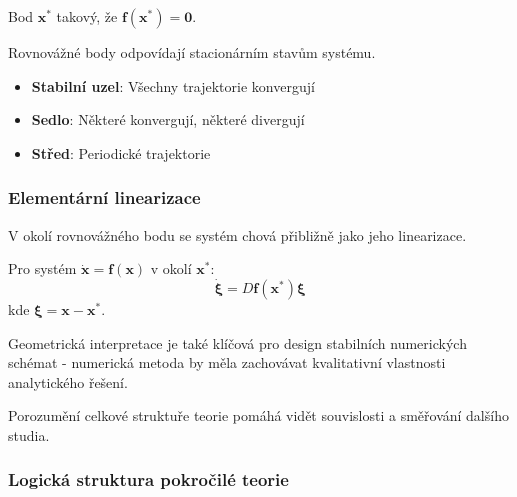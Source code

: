 \begin{definition}
Bod $\mathbf{x}^*$ takový, že $\mathbf{f}(\mathbf{x}^*) = \mathbf{0}$.
\end{definition}

\begin{intuition}
Rovnovážné body odpovídají stacionárním stavům systému.
\end{intuition}

\begin{itemize}
\item \textbf{Stabilní uzel}: Všechny trajektorie konvergují
\item \textbf{Sedlo}: Některé konvergují, některé divergují  
\item \textbf{Střed}: Periodické trajektorie
\end{itemize}

\subsubsection{Elementární linearizace}

\begin{intuition}
V okolí rovnovážného bodu se systém chová přibližně jako jeho linearizace.
\end{intuition}

\begin{definition}
Pro systém $\dot{\mathbf{x}} = \mathbf{f}(\mathbf{x})$ v okolí $\mathbf{x}^*$:
\[
\dot{\mathbf{\xi}} = D\mathbf{f}(\mathbf{x}^*)\mathbf{\xi}
\]
kde $\mathbf{\xi} = \mathbf{x} - \mathbf{x}^*$.
\end{definition}

\begin{intuition}
Geometrická interpretace je také klíčová pro design stabilních numerických schémat - numerická metoda by měla zachovávat kvalitativní vlastnosti analytického řešení.
\end{intuition}

\spc


\begin{motivation}
Porozumění celkové struktuře teorie pomáhá vidět souvislosti a směřování dalšího studia.
\end{motivation}

\subsubsection{Logická struktura pokročilé teorie}

